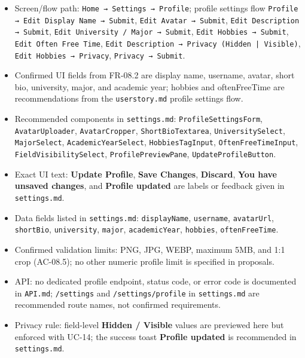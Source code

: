 \documentclass[12pt]{article}
\begin{document}
\begin{itemize}
\item Screen/flow path: \texttt{Home → Settings → Profile}; profile settings flow \texttt{Profile → Edit Display Name → Submit}, \texttt{Edit Avatar → Submit}, \texttt{Edit Description → Submit}, \texttt{Edit University / Major → Submit}, \texttt{Edit Hobbies → Submit}, \texttt{Edit Often Free Time}, \texttt{Edit Description → Privacy (Hidden | Visible)}, \texttt{Edit Hobbies → Privacy}, \texttt{Privacy → Submit}.
\item Confirmed UI fields from FR-08.2 are display name, username, avatar, short bio, university, major, and academic year; hobbies and oftenFreeTime are recommendations from the \texttt{userstory.md} profile settings flow.
\item Recommended components in \texttt{settings.md}: \texttt{ProfileSettingsForm}, \texttt{AvatarUploader}, \texttt{AvatarCropper}, \texttt{ShortBioTextarea}, \texttt{UniversitySelect}, \texttt{MajorSelect}, \texttt{AcademicYearSelect}, \texttt{HobbiesTagInput}, \texttt{OftenFreeTimeInput}, \texttt{FieldVisibilitySelect}, \texttt{ProfilePreviewPane}, \texttt{UpdateProfileButton}.
\item Exact UI text: \textbf{Update Profile}, \textbf{Save Changes}, \textbf{Discard}, \textbf{You have unsaved changes}, and \textbf{Profile updated} are labels or feedback given in \texttt{settings.md}.
\item Data fields listed in \texttt{settings.md}: \texttt{displayName}, \texttt{username}, \texttt{avatarUrl}, \texttt{shortBio}, \texttt{university}, \texttt{major}, \texttt{academicYear}, \texttt{hobbies}, \texttt{oftenFreeTime}.
\item Confirmed validation limits: PNG, JPG, WEBP, maximum 5MB, and 1:1 crop (AC-08.5); no other numeric profile limit is specified in proposals.
\item API: no dedicated profile endpoint, status code, or error code is documented in \texttt{API.md}; \texttt{/settings} and \texttt{/settings/profile} in \texttt{settings.md} are recommended route names, not confirmed requirements.
\item Privacy rule: field-level \textbf{Hidden / Visible} values are previewed here but enforced with UC-14; the success toast \textbf{Profile updated} is recommended in \texttt{settings.md}.
\end{itemize}
\par\medskip

\hypertarget{sec:b11-source-alignment-notes}{}
\end{document}

